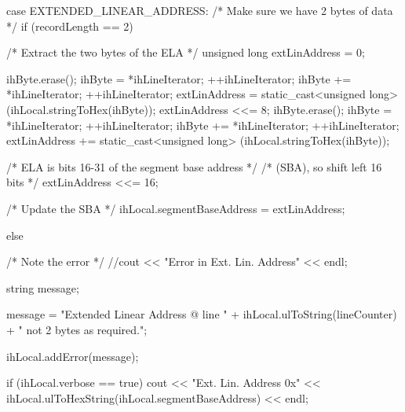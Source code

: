 \begin{DoxyCode}
{{{{{                    case EXTENDED_LINEAR_ADDRESS:
                        /* Make sure we have 2 bytes of data                  */
                        if (recordLength == 2)
                        {
                            /* Extract the two bytes of the ELA               */
                            unsigned long extLinAddress = 0;
                            
                            ihByte.erase();
                            ihByte = *ihLineIterator;
                            ++ihLineIterator;
                            ihByte += *ihLineIterator;
                            ++ihLineIterator;
                            extLinAddress = static_cast<unsigned long>
                                                  (ihLocal.stringToHex(ihByte));
                            extLinAddress <<= 8;
                            ihByte.erase();
                            ihByte = *ihLineIterator;
                            ++ihLineIterator;
                            ihByte += *ihLineIterator;
                            ++ihLineIterator;
                            extLinAddress += static_cast<unsigned long>
                                                  (ihLocal.stringToHex(ihByte));
                            
                            /* ELA is bits 16-31 of the segment base address  */
                            /* (SBA), so shift left 16 bits                   */
                            extLinAddress <<= 16;
                            
                            /* Update the SBA                                 */
                            ihLocal.segmentBaseAddress = extLinAddress;
                        }
                        else
                        {
                            /* Note the error                                 */
                            //cout << "Error in Ext. Lin. Address" << endl;
                            
                            string message;
                            
                            message = "Extended Linear Address @ line " +
                                      ihLocal.ulToString(lineCounter) + 
                                      " not 2 bytes as required.";
                            
                            ihLocal.addError(message);
                        }
                        if (ihLocal.verbose == true)
                        {
                            cout << "Ext. Lin. Address 0x" << 
                               ihLocal.ulToHexString(ihLocal.segmentBaseAddress)
                                                                        << endl;
                        }
                        
}}}}}
\end{DoxyCode}
